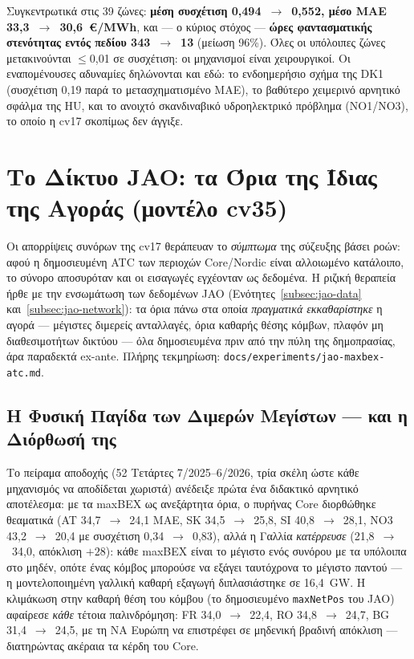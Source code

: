 Συγκεντρωτικά στις 39 ζώνες: \textbf{μέση συσχέτιση 0,494~$\to$~0,552, μέσο MAE 33,3~$\to$~30,6~€/MWh}, και --- ο κύριος στόχος --- \textbf{ώρες φαντασματικής στενότητας εντός πεδίου 343~$\to$~13} (μείωση 96\%). Όλες οι υπόλοιπες ζώνες μετακινούνται $\le$0,01 σε συσχέτιση: οι μηχανισμοί είναι χειρουργικοί. Οι εναπομένουσες αδυναμίες δηλώνονται και εδώ: το ενδοημερήσιο σχήμα της DK1 (συσχέτιση 0,19 παρά το μετασχηματισμένο MAE), το βαθύτερο χειμερινό αρνητικό σφάλμα της HU, και το ανοιχτό σκανδιναβικό υδροηλεκτρικό πρόβλημα (NO1/NO3), το οποίο η cv17 σκοπίμως δεν άγγιξε.


\section{Το Δίκτυο JAO: τα Όρια της Ίδιας της Αγοράς (μοντέλο cv35)}
\label{sec:jao-network}

Οι απορρίψεις συνόρων της cv17 θεράπευαν το \emph{σύμπτωμα} της σύζευξης βάσει ροών: αφού η δημοσιευμένη ATC των περιοχών Core/Nordic είναι αλλοιωμένο κατάλοιπο, το σύνορο αποσυρόταν και οι εισαγωγές εγχέονταν ως δεδομένα. Η ριζική θεραπεία ήρθε με την ενσωμάτωση των δεδομένων JAO (Ενότητες~\ref{subsec:jao-data} και~\ref{subsec:jao-network}): τα όρια πάνω στα οποία \emph{πραγματικά εκκαθαρίστηκε} η αγορά --- μέγιστες διμερείς ανταλλαγές, όρια καθαρής θέσης κόμβων, πλαφόν μη διαθεσιμοτήτων δικτύου --- όλα δημοσιευμένα πριν από την πύλη της δημοπρασίας, άρα παραδεκτά ex-ante. Πλήρης τεκμηρίωση: \texttt{docs/experiments/jao-maxbex-atc.md}.

\subsection{Η Φυσική Παγίδα των Διμερών Μεγίστων --- και η Διόρθωσή της}
\label{subsec:maxbex-flaw}

Το πείραμα αποδοχής (52 Τετάρτες 7/2025--6/2026, τρία σκέλη ώστε κάθε μηχανισμός να αποδίδεται χωριστά) ανέδειξε πρώτα ένα διδακτικό αρνητικό αποτέλεσμα: με τα maxBEX ως ανεξάρτητα όρια, ο πυρήνας Core διορθώθηκε θεαματικά (AT 34,7~$\to$~24,1 MAE, SK 34,5~$\to$~25,8, SI 40,8~$\to$~28,1, NO3 43,2~$\to$~20,4 με συσχέτιση 0,34~$\to$~0,83), αλλά η Γαλλία \emph{κατέρρευσε} (21,8~$\to$~34,0, απόκλιση $+28$): κάθε maxBEX είναι το μέγιστο ενός συνόρου με τα υπόλοιπα στο μηδέν, οπότε ένας κόμβος μπορούσε να εξάγει ταυτόχρονα το μέγιστο παντού --- η μοντελοποιημένη γαλλική καθαρή εξαγωγή διπλασιάστηκε σε 16,4~GW. Η κλιμάκωση στην καθαρή θέση του κόμβου (το δημοσιευμένο \texttt{maxNetPos} του JAO) αφαίρεσε \emph{κάθε} τέτοια παλινδρόμηση: FR 34,0~$\to$~22,4, RO 34,8~$\to$~24,7, BG 31,4~$\to$~24,5, με τη ΝΑ Ευρώπη να επιστρέφει σε μηδενική βραδινή απόκλιση --- διατηρώντας ακέραια τα κέρδη του Core.

